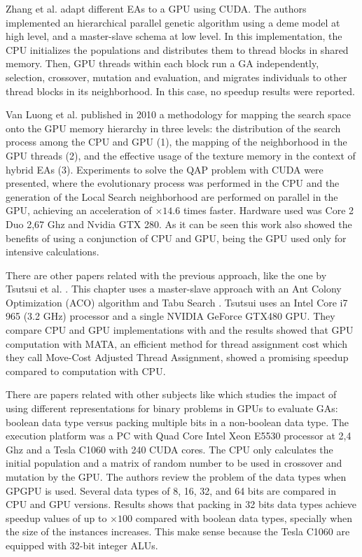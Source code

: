 \documentclass{comjnl}
\begin{document}
Zhang et al. \cite{ZhangImplementationMasterSlave} adapt different EAs to a GPU using CUDA. The authors implemented an hierarchical parallel genetic algorithm using a deme model at high level, and a master-slave schema at low level. In this implementation, the CPU initializes the populations and distributes them to thread blocks in shared memory. Then, GPU threads within each block run a GA independently, selection, crossover, mutation and evaluation, and migrates individuals to other thread blocks in its neighborhood. In this case, no speedup results were reported.

Van Luong et al. \cite{5586403} published in 2010 a methodology for mapping the search space onto the GPU memory hierarchy in three levels: the distribution of the search process among the CPU and GPU (1), the mapping of the neighborhood in the GPU threads (2), and the effective usage of the texture memory in the context of hybrid EAs (3). Experiments to solve the QAP problem with CUDA were presented, where the evolutionary process was performed in the CPU and the generation of the Local Search neighborhood are performed on parallel in the GPU, achieving an acceleration of $\times14.6$ times faster. Hardware used was Core 2 Duo 2,67 Ghz and Nvidia GTX 280. As it can be seen this work also showed the benefits of using a conjunction of CPU and GPU, being the GPU used only for intensive calculations.

There are other papers related with the previous approach, like the one by Tsutsui et al. \cite{Tsutsui:2011:GECCO}. This chapter uses a master-slave approach with an Ant Colony Optimization (ACO) algorithm \cite{Dorigo:1999:ACO:329055_329062} and Tabu Search \cite{Glover:1997:TS:549765}. Tsutsui uses an Intel Core i7 965 (3.2 GHz) processor and a single NVIDIA GeForce GTX480 GPU. They compare CPU and GPU implementations with and the results showed that GPU computation with MATA, an efficient method for thread assignment cost which they call Move-Cost Adjusted Thread Assignment, showed a promising speedup compared to computation with CPU.

There are papers related with other subjects like \cite{Pedemonte:2011:BOG:2001858.2002031} which studies the impact of using different representations for binary problems in GPUs to evaluate GAs: boolean data type versus packing multiple bits in a non-boolean data type. The execution platform was a PC with Quad Core Intel Xeon E5530 processor at 2,4 Ghz and a Tesla C1060 with 240 CUDA cores. The CPU only calculates the initial population and a matrix of random number to be used in crossover and mutation by the GPU. The authors review the problem of the data types when GPGPU is used. Several data types of 8, 16, 32, and 64 bits are compared in CPU and GPU versions. Results shows that
packing in 32 bits data types achieve speedup values of up to $\times100$ compared with boolean data types, specially when the size of the instances increases. This make sense because the Tesla C1060 are equipped with 32-bit integer ALUs. 
\end{document}
